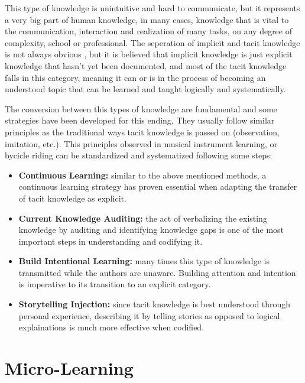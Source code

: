 This type of knowledge is unintuitive and hard to communicate, but it represents a 
very big part of human knowledge, in many cases, knowledge that is vital to the 
communication, interaction and realization of many tasks, on any degree of complexity,
school or professional. The seperation of implicit and tacit knowledge is not always
obvious \cite{troublewithtacitknowledge}, but it is believed that implicit knowledge
is just explicit knowledge that hasn't yet been documented, and most of the tacit 
knowledge falls in this category, meaning it can or is in the process of becoming an
understood topic that can be learned and taught logically and systematically.

The conversion between this types of knowledge are fundamental and some strategies 
have been developed for this ending. They usually follow similar principles as the 
traditional ways tacit knowledge is passed on (observation, imitation, etc.). This
principles observed in musical instrument learning, or bycicle riding can be 
standardized and systematized following some steps:

\begin{itemize}
    \item \textbf{Continuous Learning:} similar to the above mentioned methods, 
        a continuous learning strategy has proven essential when adapting the transfer
        of tacit knowledge as explicit.
    \item \textbf{Current Knowledge Auditing:}
        the act of verbalizing the existing knowledge by auditing and identifying 
        knowledge gaps is one of the most important steps in understanding and 
        codifying it.
    \item \textbf{Build Intentional Learning:}
        many times this type of knowledge is transmitted while the authors are 
        unaware. Building attention and intention is imperative to its transition to
        an explicit category.
    \item \textbf{Storytelling Injection:}
        since tacit knowledge is best understood through personal experience, 
        describing it by telling stories as opposed to logical explainations 
        is much more effective when codified.
\end{itemize}



\section{Micro-Learning}

